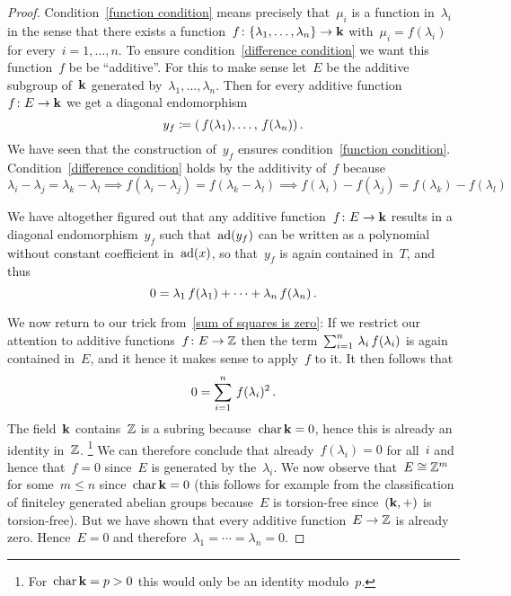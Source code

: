 \begin{proof}
  Condition~\eqref{function condition} means precisely that~$\mu_i$ is a function in~$\lambda_i$ in the sense that there exists a function~$f \colon \{\lambda_1, \dotsc, \lambda_n\} \to \mathbf{k}$ with~$\mu_i = f(\lambda_i)$ for every~$i = 1, \dotsc, n$.
  To ensure condition~\eqref{difference condition} we want this function~$f$ be be \enquote{additive}.
  For this to make sense let~$E$ be the additive subgroup of~$\mathbf{k}$ generated by~$\lambda_1, \dotsc, \lambda_n$.
  Then for every additive function~$f \colon E \to \mathbf{k}$ we get a diagonal endomorphism
  \[
    y_f
    \coloneqq
    (\, f(\lambda_1), \dotsc, \,  f(\lambda_n))  \,.
  \]
  We have seen that the construction of~$y_f$ ensures condition~\eqref{function condition}.
  Condition~\eqref{difference condition} holds by the additivity of~$f$ because
  \[
    \lambda_i - \lambda_j
    =
    \lambda_k - \lambda_l
    \implies
    f(\lambda_i - \lambda_j)
    =
    f(\lambda_k - \lambda_l)
    \implies
    f(\lambda_i) - f(\lambda_j)
    =
    f(\lambda_k) - f(\lambda_l)
  \]
  
  We have altogether figured out that any additive function~$f \colon E \to \mathbf{k}$ results in a diagonal endomorphism~$y_f$ such that~$\operatorname{ad}(y_f)$ can be written as a polynomial without constant coefficient in~$\operatorname{ad}(x)$, so that~$y_f$ is again contained in~$T$, and thus
  \[
    0
    =
    \lambda_1 \, f(\lambda_1) + \dotsb + \lambda_n \, f(\lambda_n)  \,.
  \]
  
  We now return to our trick from~\eqref{sum of squares is zero}:
  If we restrict our attention to additive functions~$f \colon E \to \mathbb{Z}$ then the term~$\sum_{i=1}^n \, \lambda_i \, f(\lambda_i)$ is again contained in~$E$, and it hence it makes sense to apply~$f$ to it.
  It then follows that
  \[
    0
    =
    \sum_{i=1}^n \, f(\lambda_i)^2 \,.
  \]
  The field~$\mathbf{k}$ contains~$\mathbb{Z}$ is a subring because~$\operatorname{char} \mathbf{k} = 0$, hence this is already an identity in~$\mathbb{Z}$.%
  \footnote{For~$\operatorname{char} \mathbf{k} = p > 0$ this would only be an identity modulo~$p$.}
  We can therefore conclude that already~$f(\lambda_i) = 0$ for all~$i$ and hence that~$f = 0$ since~$E$ is generated by the~$\lambda_i$.
  We now observe that~$E \cong \mathbb{Z}^m$ for some~$m \leq n$ since~$\operatorname{char} \mathbf{k} = 0$ (this follows for example from the classification of finiteley generated abelian groups because~$E$ is torsion-free since~$(\mathbf{k},+)$ is torsion-free).
  But we have shown that every additive function~$E \to \mathbb{Z}$ is already zero.
  Hence~$E = 0$ and therefore~$\lambda_1 = \dotsb = \lambda_n = 0$.
\end{proof}


